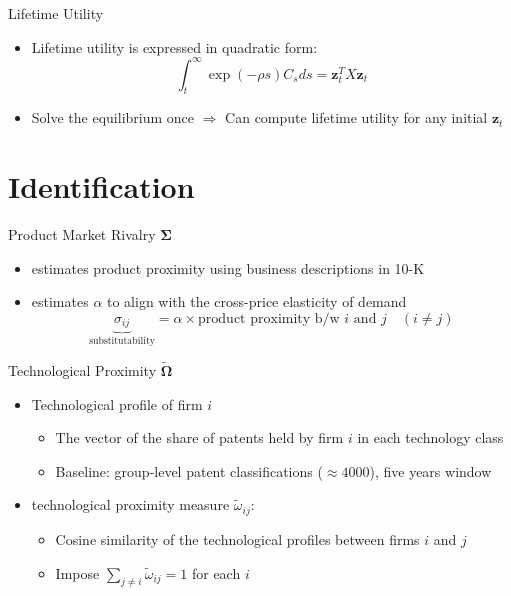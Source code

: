 \documentclass[
  10pt,               %
  aspectratio=169,     %
]{beamer}
\theoremstyle{plain}
\begin{document}
\begin{frame}{Lifetime Utility}

  \label{aggregation}
  \begin{itemize}
    \item Lifetime utility is expressed in quadratic form:
          \[
            \int_{t}^{\infty}\exp\left(-\rho s\right)C_{s}ds=\bm{z}_{t}^{T}X\bm{z}_{t}
          \]

          \hyperlink{X}{}
    \item Solve the equilibrium once $\Longrightarrow$ Can compute lifetime utility for any initial $\bm{z}_{t}$
  \end{itemize}
\end{frame}

\section{Identification}

\begin{frame}{Product Market Rivalry $\bm{\Sigma}$}

  \begin{itemize}
    \item \label{product_identification} \citet{Hoberg2016-jm} estimates product proximity using business
          descriptions in 10-K
          \medskip{}
    \item \citet{Pellegrino2024-dn} estimates $\alpha$ to align with the cross-price
          elasticity of demand
          \medskip{}
          \[
            \underbrace{\sigma_{ij}}_{\text{substitutability}}=\alpha\times\text{product proximity b/w }i\text{ and }j\quad\left(i\neq j\right)
          \]\hyperlink{micro_vs_ghl}{}
  \end{itemize}
\end{frame}

\begin{frame}{Technological Proximity $\widetilde{\bm{\Omega}}$}
  \begin{itemize}
    \item Technological profile of firm $i$
          \begin{itemize}
            \item The vector of the share of patents held by firm $i$ in each technology class
            \item Baseline: group-level patent classifications ($\approx 4000$), five years window
                  \medskip{}
          \end{itemize}
          \medskip{}
    \item \citet{Jaffe1986-yz} technological proximity measure $\tilde{\omega}_{ij}$:
          \begin{itemize}
            \item Cosine similarity of the technological profiles between firms $i$ and $j$
            \item Impose $\sum_{j\neq i}\tilde{\omega}_{ij} = 1$ for each $i$
          \end{itemize}
  \end{itemize}
\end{frame}
\end{document}
